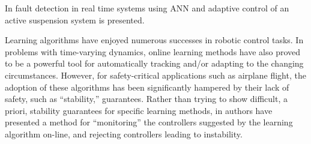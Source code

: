 \documentclass[conference]{IEEEtran}
\begin{document}
In \cite{marko1991nips} fault detection in real time systems using ANN and adaptive control of an active suspension system is presented.

Learning algorithms have enjoyed numerous successes in robotic control tasks. In problems with time-varying dynamics, online learning methods have also proved to be a powerful tool for automatically tracking and/or adapting to the changing circumstances. However, for safety-critical applications such as airplane flight, the adoption of these algorithms has been significantly hampered by their lack of safety, such as “stability,” guarantees. Rather than trying to show difficult, a priori, stability guarantees for specific learning methods, in \cite{kim2005nips} authors have presented a method for “monitoring” the controllers suggested by the learning algorithm on-line, and rejecting controllers leading to instability.



\end{document}
